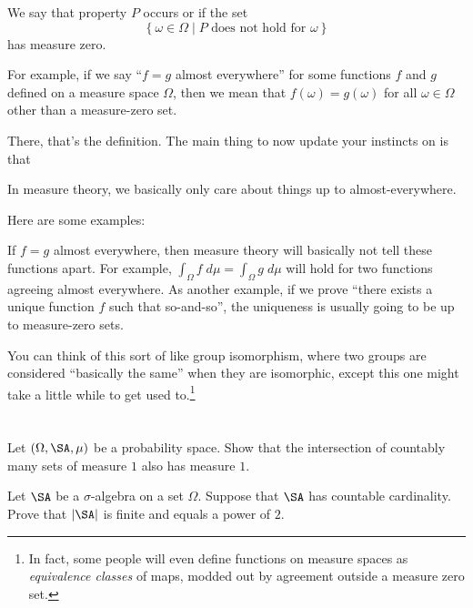 \begin{definition}
	We say that property $P$ occurs
	 or  if the set
	\[ \left\{ \omega \in \Omega \mid \text{$P$ does not hold for $\omega$} \right\} \]
	has measure zero.
\end{definition}

For example, if we say ``$f = g$ almost everywhere''
for some functions $f$ and $g$ defined on a measure space $\Omega$,
then we mean that $f(\omega) = g(\omega)$ for all $\omega \in \Omega$
other than a measure-zero set.

There, that's the definition.
The main thing to now update your instincts on is that
\begin{moral}
	In measure theory,
	we basically only care about things up to almost-everywhere.
\end{moral}
Here are some examples:
\begin{itemize}
	\ii If $f=g$ almost everywhere,
	then measure theory will basically not tell these functions apart.
	For example, $\int_\Omega f \; d\mu = \int_\Omega g \; d\mu$
	will hold for two functions agreeing almost everywhere.
	\ii As another example,
	if we prove ``there exists a unique function $f$ such that so-and-so'',
	the uniqueness is usually going to be up to measure-zero sets.
\end{itemize}
You can think of this sort of like group isomorphism,
where two groups are considered ``basically the same'' when they are isomorphic,
except this one might take a little while to get used to.\footnote{In fact,
	some people will even define functions on measure spaces
	as \emph{equivalence classes} of maps,
	modded out by agreement outside a measure zero set.}

\section{\problemhead}
\begin{dproblem}
	Let $(\Omega, \SA, \mu)$ be a probability space.
	Show that the intersection of countably many sets of measure $1$
	also has measure $1$.
\end{dproblem}

\begin{problem}
	\onechili
	Let $\SA$ be a $\sigma$-algebra on a set $\Omega$.
	Suppose that $\SA$ has countable cardinality.
	Prove that $|\SA|$ is finite and equals a power of $2$.
\end{problem}
